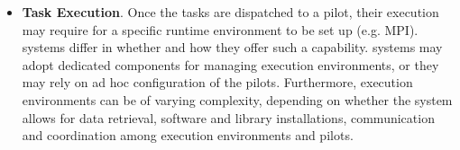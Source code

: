 \documentclass{sig-alternate}
\begin{document}
\begin{itemize}
\item \textbf{Task Execution}. Once the tasks are dispatched to a pilot, their
  execution may require for a specific runtime environment to be set up (e.g.
  MPI). \pilot systems differ in whether and how they offer such a capability.
  \pilot systems may adopt dedicated components for managing execution
  environments, or they may rely on ad hoc configuration of the pilots.
  Furthermore, execution environments can be of varying complexity, depending on
  whether the \pilot system allows for data retrieval, software and library
  installations, communication and coordination among execution environments and
  pilots.



\end{itemize}
\end{document}

